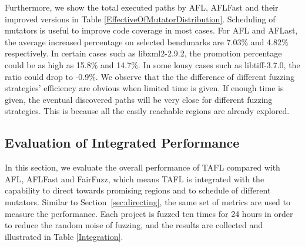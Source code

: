 Furthermore, we show the total executed paths by AFL, AFLFast and their improved versions in Table \ref{EffectiveOfMutatorDistribution}.
Scheduling of mutators is useful to improve code coverage in most cases. For AFL and AFLast, the average increased percentage on selected benchmarks are 7.03\% and 4.82\% respectively. In certain cases such as libxml2-2.9.2, the promotion percentage could be as high as 15.8\% and 14.7\%. In some lousy cases such as libtiff-3.7.0, the ratio could drop to -0.9\%. We observe that the the difference of different fuzzing strategies' efficiency are obvious when limited time is given. If enough time is given, the eventual discovered paths will be very close for different fuzzing strategies. This is because all the easily reachable regions are already explored.

\subsection{Evaluation of Integrated Performance}
In this section, we evaluate the overall performance of TAFL compared with AFL, AFLFast and FairFuzz, which means TAFL is integrated with the capability to direct towards promising regions and
to schedule of different mutators. Similar to Section~\ref{sec:directing}, the same set of metrics are used to measure the performance. Each project is fuzzed ten times for 24 hours in order to reduce the random noise of fuzzing, and the results are collected and illustrated in Table \ref{Integration}.


